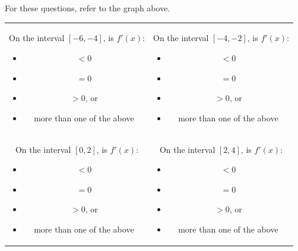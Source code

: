 \documentclass[handout]{ximera}
\begin{document}
\begin{problem}

For these questions, refer to the graph above.

\begin{enumerate}

\begin{tabular}{cc}

\begin{minipage}[t]{.5\textwidth}
\item On the interval $[-6, -4]$, is $f'(x)$:\hspace{1cm}\hspace{1cm}
\begin{itemize}
\item $<0$
\item $=0$
\item $>0$, or
\item more than one of the above
\end{itemize}
\end{minipage}

&

\begin{minipage}[t]{.5\textwidth}
\item On the interval $[-4, -2]$, is $f'(x)$:
\begin{itemize}
\item $<0$
\item $=0$
\item $>0$, or
\item more than one of the above
\end{itemize}
\end{minipage}

\\

\begin{minipage}[t]{.5\textwidth}
\item On the interval $[0, 2]$, is $f'(x)$:
\begin{itemize}
\item $<0$
\item $=0$
\item $>0$, or
\item more than one of the above
\end{itemize}
\end{minipage}

&

\begin{minipage}[t]{.5\textwidth}
\item On the interval $[2, 4]$, is $f'(x)$:
\begin{itemize}
\item $<0$
\item $=0$
\item $>0$, or
\item more than one of the above
\end{itemize}
\end{minipage}

\end{tabular}

\end{enumerate}

\end{problem}
\end{document}
